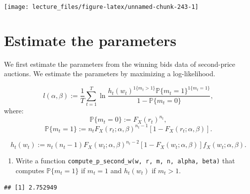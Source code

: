 \documentclass[
]{book}
\newenvironment{Shaded}{\begin{snugshade}}{\end{snugshade}}
\newcommand{\CommentTok}[1]{\textcolor[rgb]{0.56,0.35,0.01}{\textit{#1}}}
\newcommand{\DecValTok}[1]{\textcolor[rgb]{0.00,0.00,0.81}{#1}}
\newcommand{\FunctionTok}[1]{\textcolor[rgb]{0.00,0.00,0.00}{#1}}
\newcommand{\NormalTok}[1]{#1}
\newcommand{\OtherTok}[1]{\textcolor[rgb]{0.56,0.35,0.01}{#1}}
\newcommand{\SpecialCharTok}[1]{\textcolor[rgb]{0.00,0.00,0.00}{#1}}
\providecommand{\tightlist}{%
  \setlength{\itemsep}{0pt}\setlength{\parskip}{0pt}}
\begin{document}
\begin{center}\texttt{[image: lecture\_files/figure-latex/unnamed-chunk-243-1]} \end{center}

\hypertarget{estimate-the-parameters-5}{%
\section{Estimate the parameters}\label{estimate-the-parameters-5}}

We first estimate the parameters from the winning bids data of second-price auctions. We estimate the parameters by maximizing a log-likelihood.

\[
l(\alpha, \beta) := \frac{1}{T} \sum_{t = 1}^T \ln\frac{h_t(w_t)^{1\{m_t > 1\}} \mathbb{P}\{m_t = 1\}^{1\{m_t = 1\}}}{1 - \mathbb{P}\{m_t = 0\}},
\]
where:
\[
\mathbb{P}\{m_t = 0\} := F_X(r_t)^{n_t},
\]
\[
\mathbb{P}\{m_t = 1\} := n_t F_X(r_t; \alpha, \beta)^{n_t - 1} [1 - F_X(r_t; \alpha, \beta)].
\]

\[
h_t(w_t) := n_t (n_t - 1) F_X(w_t; \alpha, \beta)^{n_t - 2} [1 - F_X(w_t; \alpha, \beta)] f_X(w_t; \alpha, \beta).
\]

\begin{enumerate}
\def\labelenumi{\arabic{enumi}.}
\tightlist
\item
  Write a function \texttt{compute\_p\_second\_w(w,\ r,\ m,\ n,\ alpha,\ beta)} that computes \(\mathbb{P}\{m_t = 1\}\) if \(m_t = 1\) and \(h_t(w_t)\) if \(m_t > 1\).
\end{enumerate}

\begin{Shaded}
\end{Shaded}

\begin{verbatim}
## [1] 2.752949
\end{verbatim}
\end{document}

